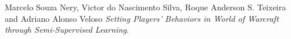 \documentclass[10pt, reqno]{amsart}
\begin{document}
\begin{thebibliography}{99}

 Marcelo Souza Nery, Victor do Nascimento Silva, Roque Anderson S. Teixeira and Adriano Alonso Veloso \textit{Setting Players’ Behaviors in World of Warcraft through Semi-Supervised Learning}.


\end{thebibliography}
\end{document}
